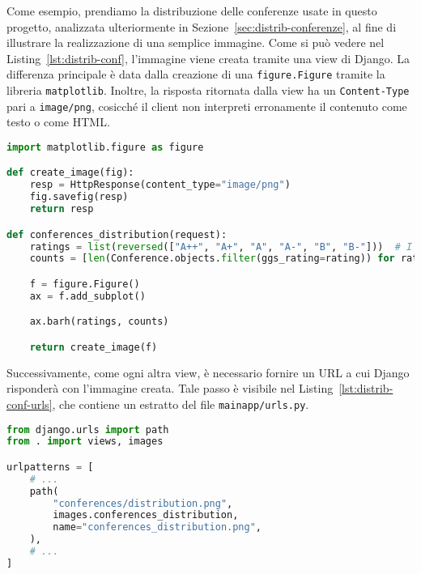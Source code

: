 Come esempio, prendiamo la distribuzione delle conferenze usate in questo
progetto, analizzata ulteriormente in Sezione~\ref{sec:distrib-conferenze},
al fine di illustrare la realizzazione di una semplice immagine.
Come si può vedere nel Listing~\ref{lst:distrib-conf}, l'immagine viene creata
tramite una view di Django. La differenza principale è data dalla creazione
di una \texttt{figure.Figure} tramite la libreria \texttt{matplotlib}.
Inoltre, la risposta ritornata dalla view ha un \texttt{Content-Type} pari a
\texttt{image/png}, cosicché il client non interpreti erronamente il contenuto
come testo o come HTML.

\begin{lstlisting}[language=Python, caption=Distribuzione delle conferenze, label=lst:distrib-conf]
import matplotlib.figure as figure

def create_image(fig):
    resp = HttpResponse(content_type="image/png")
    fig.savefig(resp)
    return resp

def conferences_distribution(request):
    ratings = list(reversed(["A++", "A+", "A", "A-", "B", "B-"]))  # I want A++ on top
    counts = [len(Conference.objects.filter(ggs_rating=rating)) for rating in ratings]

    f = figure.Figure()
    ax = f.add_subplot()

    ax.barh(ratings, counts)

    return create_image(f)
\end{lstlisting}

Successivamente, come ogni altra view, è necessario fornire un URL a cui
Django risponderà con l'immagine creata. Tale passo è visibile nel
Listing~\ref{lst:distrib-conf-urls}, che contiene un estratto del file
\texttt{mainapp/urls.py}.

\begin{lstlisting}[language=Python, caption=Estratto di \texttt{mainapp/urls.py}, label=lst:distrib-conf-urls]
from django.urls import path
from . import views, images

urlpatterns = [
    # ...
    path(
        "conferences/distribution.png",
        images.conferences_distribution,
        name="conferences_distribution.png",
    ),
    # ...
]
\end{lstlisting}
